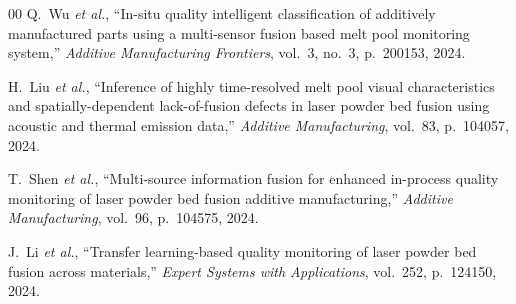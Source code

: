 \documentclass[journal]{IEEEtran}
\begin{document}
\begin{thebibliography}{00}
Q.~Wu \emph{et al.}, ``In-situ quality intelligent classification of additively manufactured parts using a multi-sensor fusion based melt pool monitoring system,'' \emph{Additive Manufacturing Frontiers}, vol.~3, no.~3, p.~200153, 2024.

H.~Liu \emph{et al.}, ``Inference of highly time-resolved melt pool visual characteristics and spatially-dependent lack-of-fusion defects in laser powder bed fusion using acoustic and thermal emission data,'' \emph{Additive Manufacturing}, vol.~83, p.~104057, 2024.

T.~Shen \emph{et al.}, ``Multi-source information fusion for enhanced in-process quality monitoring of laser powder bed fusion additive manufacturing,'' \emph{Additive Manufacturing}, vol.~96, p.~104575, 2024.

J.~Li \emph{et al.}, ``Transfer learning-based quality monitoring of laser powder bed fusion across materials,'' \emph{Expert Systems with Applications}, vol.~252, p.~124150, 2024.

\end{thebibliography}
\end{document}

